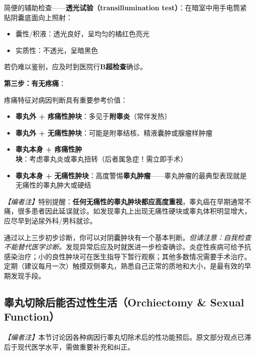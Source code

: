 \begin{enumerate}
简便的辅助检查——\textbf{透光试验（transillumination test）}：在暗室中用手电筒紧贴阴囊底面向上照射：
\begin{itemize}
	\item 囊性/积液：透光良好，呈均匀的橘红色亮光
	\item 实质性：不透光，呈暗黑色
\end{itemize}

若仍难以鉴别，应及时到医院行\textbf{B超检查}确诊。

\vspace{0.5em}
\noindent\textbf{第三步：有无疼痛}：

疼痛特征对病因判断具有重要参考价值：

\begin{itemize}
	\item \textbf{睾丸外 + 疼痛性肿块}：多见于\textbf{附睾炎}（常伴发热）
	\item \textbf{睾丸外 + 无痛性肿块}：可能是附睾结核、精液囊肿或腺瘤样肿瘤
	\item \textbf{睾丸本身 + 疼痛性肿块}：考虑睾丸炎或睾丸扭转（后者属急症！需立即手术）
	\item \textbf{睾丸本身 + 无痛性肿块}：高度警惕\textbf{睾丸肿瘤}——睾丸肿瘤的最典型表现就是无痛性的睾丸肿大或硬结
\end{itemize}

\noindent\textit{【编者注】}特别提醒：\textbf{任何无痛性的睾丸肿块都应高度重视}，睾丸癌在早期通常不痛，很多患者因此延误就诊。如发现睾丸上出现无痛性硬块或睾丸体积明显增大，应尽早到泌尿外科/男科就诊。

\begin{tcolorbox}[colback=pink!5!white,colframe=red!50!black,title=贴心小叮咛]
通过以上三步初步诊断，你可以对阴囊肿块有一个基本判断。\textit{但请注意：自我检查不能替代医学诊断。}发现异常后应及时就医进一步检查确诊。炎症性疾病可给予抗感染治疗；小的良性肿块可在医生指导下暂行观察；其他多数情况需要手术治疗。定期（建议每月一次）触摸双侧睾丸，熟悉自己正常的质地和大小，是最有效的早期发现手段。
\end{tcolorbox}

\subsection{睾丸切除后能否过性生活（Orchiectomy & Sexual Function）}

\noindent\textit{【编者注】}本节讨论因各种病因行睾丸切除术后的性功能预后。原文部分观点已滞后于现代医学水平，需做重要补充和纠正。


\end{enumerate}
